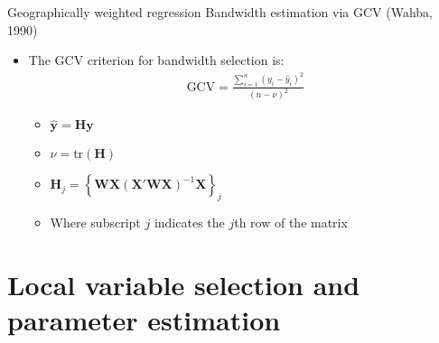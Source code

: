 \documentclass[12pt,t,handout]{beamer}
\newcommand{\subt}[1]{{\footnotesize \color{subtitle} {#1}}}
\begin{document}
\begin{frame}{Geographically weighted regression}
\subt{Bandwidth estimation via GCV (Wahba, 1990)}

\bigskip
\begin{itemize}
    \item The GCV criterion for bandwidth selection is:
    \begin{align*}
      \text{GCV} = \frac{\sum_{i=1}^n \left(y_i - \hat{y}_i\right)^2}{(n-\nu)^2}
    \end{align*}
    \begin{itemize}
        \item $\hat{\bm{y}} = \bm{H}\bm{y}$
        \item $\nu = \text{tr}(\bm{H})$
        \item $\bm{H}_j = \left\{ \bm{W} \bm{X} (\bm{X}'\bm{W}\bm{X})^{-1} \bm{X} \right\}_j$
        \item Where subscript $j$ indicates the $j$th row of the matrix
    \end{itemize}
\end{itemize}

\end{frame}






\section{Local variable selection and parameter estimation}
\end{document}
